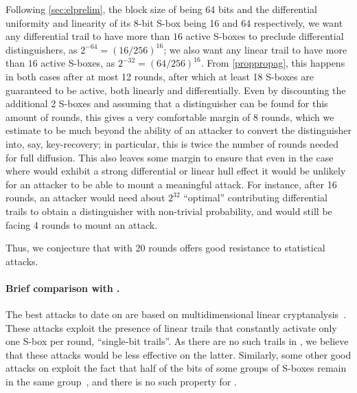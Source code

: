 Following \autoref{sec:elprelim}, the block size of \fly being 64 bits and the differential uniformity and linearity
of its 8-bit S-box being 16 and 64 respectively, we want any differential trail to have more than $16$ active S-boxes to preclude
differential distinguishers, as $2^{-64} = (16/256)^{16}$; we also want any linear trail to have more than $16$ active S-boxes,
as $2^{-32} = (64/256)^{16}$. From \autoref{proppropag}, this happens in both cases after at most 12 rounds, after which at least
18 S-boxes are guaranteed to be active, both linearly and differentially.
Even by discounting the additional 2 S-boxes and assuming that a distinguisher can be found for this amount of rounds, this gives a very comfortable margin of 8 rounds,
which we estimate to be much beyond the ability of an attacker to convert the distinguisher into, say, key-recovery; in particular, this is twice the number of rounds needed
for full diffusion.
This also leaves some margin to ensure that even in the case where \fly would exhibit a strong differential or linear hull effect it would be unlikely for an attacker to be able
to mount a meaningful attack. For instance, after 16 rounds, an attacker would need about $2^{32}$ ``optimal'' contributing differential trails
to obtain a distinguisher with non-trivial
probability, and would still be facing 4 rounds to mount an attack.

Thus, we conjecture that \fly with 20 rounds offers good resistance to statistical attacks.

\paragraph{Brief comparison with \present.}
The best attacks to date on \present are based on multidimensional linear cryptanalysis~\cite{DBLP:conf/ctrsa/Cho10,DBLP:journals/iacr/BogdanovTV16}. These attacks exploit the presence of linear trails
that constantly activate only one S-box per round, \ie ``single-bit trails''. As there are no such trails in \fly, we believe that these attacks would be less effective
on the latter. Similarly, some other good attacks on \present exploit the fact that half of the bits of some groups of S-boxes remain in the same group~\cite{DBLP:conf/ctrsa/CollardS09},
and there is no such property for \fly.

